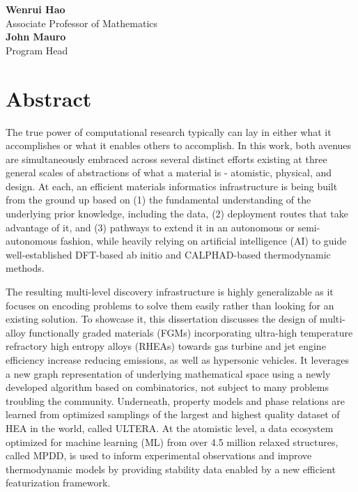 \documentclass[letterpaper, 12pt]{report}
\begin{document}
\textbf{Wenrui Hao}\\
Associate Professor of Mathematics\\

\textbf{John Mauro}\\
Program Head\\

\vfill


\newpage
\chapter*{Abstract}

The true power of computational research typically can lay in either what it accomplishes or what it enables others to accomplish. In this work, both avenues are simultaneously embraced across several distinct efforts existing at three general scales of abstractions of what a material is - atomistic, physical, and design. At each, an efficient materials informatics infrastructure is being built from the ground up based on (1) the fundamental understanding of the underlying prior knowledge, including the data, (2) deployment routes that take advantage of it, and (3) pathways to extend it in an autonomous or semi-autonomous fashion, while heavily relying on artificial intelligence (AI) to guide well-established DFT-based ab initio and CALPHAD-based thermodynamic methods.

The resulting multi-level discovery infrastructure is highly generalizable as it focuses on encoding problems to solve them easily rather than looking for an existing solution. To showcase it, this dissertation discusses the design of multi-alloy functionally graded materials (FGMs) incorporating ultra-high temperature refractory high entropy alloys (RHEAs) towards gas turbine and jet engine efficiency increase reducing  emissions, as well as hypersonic vehicles. It leverages a new graph representation of underlying mathematical space using a newly developed algorithm based on combinatorics, not subject to many problems troubling the community. Underneath, property models and phase relations are learned from optimized samplings of the largest and highest quality dataset of HEA in the world, called ULTERA. At the atomistic level, a data ecosystem optimized for machine learning (ML) from over 4.5 million relaxed structures, called MPDD, is used to inform experimental observations and improve thermodynamic models by providing stability data enabled by a new efficient featurization framework.
\end{document}
